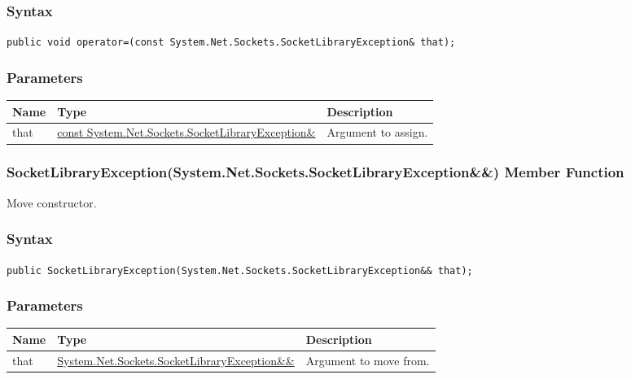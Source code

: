 \documentclass[a4paper,oneside,11.000000pt]{book}
\begin{document}
\subsubsection*{Syntax}
\texttt{public void operator=(const System.Net.Sockets.SocketLibraryException\& that);}
\subsubsection*{Parameters}
\begin{flushleft}
\begin{supertabular}[l]{!{\raggedright}p{1.30721cm}!{\raggedright}p{8.55945cm}!{\raggedright}p{4.89046cm}}
\textbf{Name}
& \textbf{Type}
& \textbf{Description}
\\
\hline
that
& \hyperlink{System.Net.Sockets.SocketLibraryException}{const System.\-Net.\-Sockets.\-SocketLibraryException\&\-}
& Argument to assign.

\\
\end{supertabular}

\end{flushleft}
\clearpage

\hypertarget{System.Net.Sockets.SocketLibraryException.constructor.P.System.Net.Sockets.SocketLibraryException.RR.System.Net.Sockets.SocketLibraryException}{\subsubsection*{SocketLibraryException(System.Net.Sockets.SocketLibraryException\&\&) Member Function}}\begin{flushleft}
Move constructor.

\end{flushleft}
\subsubsection*{Syntax}
\texttt{public SocketLibraryException(System.Net.Sockets.SocketLibraryException\&\& that);}
\subsubsection*{Parameters}
\begin{flushleft}
\begin{supertabular}[l]{!{\raggedright}p{1.30721cm}!{\raggedright}p{8.55945cm}!{\raggedright}p{4.93333cm}}
\textbf{Name}
& \textbf{Type}
& \textbf{Description}
\\
\hline
that
& \hyperlink{System.Net.Sockets.SocketLibraryException}{System.\-Net.\-Sockets.\-SocketLibraryException\&\-\&\-}
& Argument to move from.

\\
\end{supertabular}

\end{flushleft}
\clearpage
\end{document}
